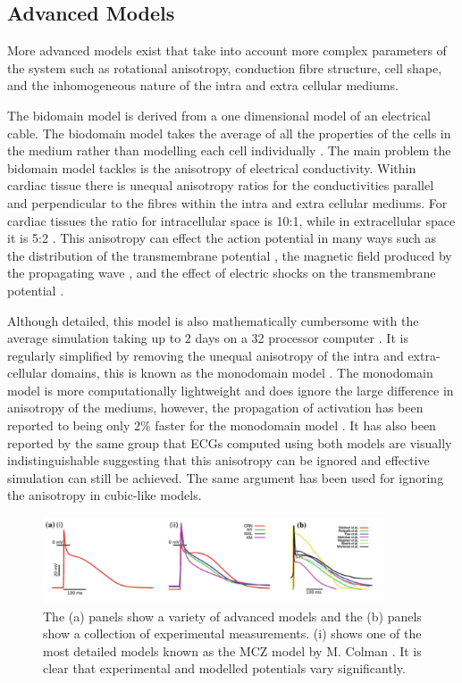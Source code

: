\subsection{Advanced Models}
More advanced models exist that take into account more complex parameters of the system such as rotational anisotropy, conduction fibre structure, cell shape, and the inhomogeneous nature of the intra and extra cellular mediums. \par
The bidomain model is derived from a one dimensional model of an electrical cable. The biodomain model takes the average of all the properties of the cells in the medium rather than modelling each cell individually \citep{bidomain}. The main problem the bidomain model tackles is the anisotropy of electrical conductivity. Within cardiac tissue there is unequal anisotropy ratios for the conductivities parallel and perpendicular to the fibres within the intra and extra cellular mediums. For cardiac tissues the ratio for intracellular space is 10:1, while in extracellular space it is 5:2 \citep{bidomainans}. This anisotropy can effect the action potential in many ways such as the distribution of the transmembrane potential \citep{disttrans}, the magnetic field produced by the propagating wave \citep{magfield}, and the effect of electric shocks on the transmembrane potential \citep{shocks}. \par 
Although detailed, this model is also mathematically cumbersome with the average simulation taking up to 2 days on a 32 processor computer \citep{monodomain}. It is regularly simplified by removing the unequal anisotropy of the intra and extra-cellular domains, this is known as the monodomain model \citep{monodomain}. The monodomain model is more computationally lightweight and does ignore the large difference in anisotropy of the mediums, however, the propagation of activation has been reported to being only 2\% faster for the monodomain model \citep{monodomain}. It has also been reported by the same group that ECGs computed using both models are visually indistinguishable suggesting that this anisotropy can be ignored and effective simulation can still be achieved. The same argument has been used for ignoring the anisotropy in cubic-like models.
\begin{figure}[H]
    \centering
    \includegraphics[width=0.9\textwidth]{images/APmodels.png}
    \caption{The (a) panels show a variety of advanced models and the (b) panels show a collection of experimental measurements. (i) shows one of the most detailed models known as the MCZ model by M. Colman \citep{phdpaper}. It is clear that experimental and modelled potentials vary significantly. \citep{phdpaper}}
    \label{fig2b.5}
\end{figure}